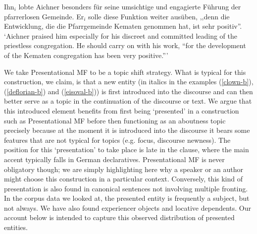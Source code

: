 \begin{exe}
\begin{xlist}[iv.]
\begin{exe}
\begin{xlist}[iv.]
\ex Ihn$_i$ lobte Aichner besonders für seine umsichtige und engagierte Füh\-rung der pfarrerlosen Gemeinde. Er$_i$ solle diese Funktion weiter aus\-üben, ,,denn die Entwicklung, die die Pfarrgemeinde Kematen genommen hat, ist sehr positiv''.\\
  `Aichner praised him especially for his discreet and committed leading of the priestless congregation. He should carry on with his work, ``for the development of the Kematen congregation has been very positive.'''\\  
\zl

We take Presentational MF to be a topic shift strategy. What is typical for this construction, we claim, is that a new entity (in italics in the examples (\ref{clown-b}), (\ref{deflorian-b}) and (\ref{eisoval-b})) is first introduced into the discourse and can then better serve as a topic in the continuation of the discourse or text. We argue that this introduced element benefits from first being `presented' in a construction such as Presentational MF before then functioning as an aboutness topic precisely because at the moment it is introduced into the discourse it bears some features that are not typical for topics (e.g. focus, discourse newness). The position for this `presentation' to take place is late in the clause, where the main accent typically falls in German declaratives. Presentational MF is never obligatory though; we are simply highlighting here why a speaker or an author might choose this construction in a particular context. Conversely, this kind of presentation is also found in canonical sentences not involving multiple fronting. In the corpus data we looked at, the presented entity is frequently a subject, but not always. We have also found experiencer objects and locative dependents. Our account below is intended to capture this observed distribution of presented entities. 



\end{xlist}
\end{exe}
\end{xlist}
\end{exe}
